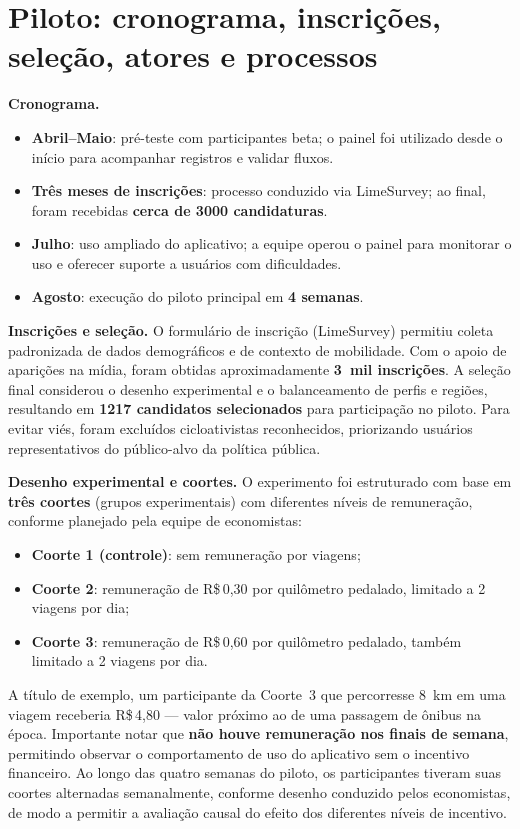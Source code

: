 \section{Piloto: cronograma, inscrições, seleção, atores e processos}
\textbf{Cronograma.} \begin{itemize}
  \item \textbf{Abril--Maio}: pré-teste com participantes beta; o painel foi
        utilizado desde o início para acompanhar registros e validar fluxos.
  \item \textbf{Três meses de inscrições}: processo conduzido via LimeSurvey;
        ao final, foram recebidas \textbf{cerca de 3000 candidaturas}.
  \item \textbf{Julho}: uso ampliado do aplicativo; a equipe operou o painel
        para monitorar o uso e oferecer suporte a usuários
        com dificuldades.
  \item \textbf{Agosto}: execução do piloto principal em \textbf{4 semanas}.
\end{itemize}

\textbf{Inscrições e seleção.} O formulário de inscrição (LimeSurvey) permitiu
coleta padronizada de dados demográficos e de contexto de mobilidade. Com o
apoio de aparições na mídia, foram obtidas aproximadamente \textbf{3~mil
inscrições}. A seleção final considerou o desenho experimental e o balanceamento
de perfis e regiões, resultando em \textbf{1217 candidatos selecionados} para
participação no piloto. Para evitar viés, foram excluídos cicloativistas
reconhecidos, priorizando usuários representativos do público-alvo da política
pública.

\textbf{Desenho experimental e coortes.} O experimento foi estruturado com base
em \textbf{três coortes} (grupos experimentais) com diferentes níveis de
remuneração, conforme planejado pela equipe de economistas:
\begin{itemize}
  \item \textbf{Coorte 1 (controle)}: sem remuneração por viagens;
  \item \textbf{Coorte 2}: remuneração de R\$\,0,30 por quilômetro pedalado,
        limitado a 2 viagens por dia;
  \item \textbf{Coorte 3}: remuneração de R\$\,0,60 por quilômetro pedalado,
        também limitado a 2 viagens por dia.
\end{itemize}
A título de exemplo, um participante da Coorte~3 que percorresse 8~km em uma
viagem receberia R\$\,4,80 --- valor próximo ao de uma passagem de ônibus na
época. Importante notar que \textbf{não houve remuneração nos finais de semana},
permitindo observar o comportamento de uso do aplicativo sem o incentivo
financeiro. Ao longo das quatro semanas do piloto, os participantes tiveram suas
coortes alternadas semanalmente, conforme desenho conduzido pelos economistas,
de modo a permitir a avaliação causal do efeito dos diferentes níveis de
incentivo.

